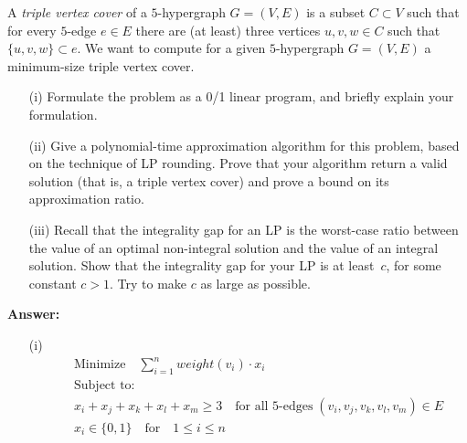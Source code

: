 \documentclass{article}
\renewcommand{\leq}{\leqslant}
\renewcommand{\geq}{\geqslant}
\newcounter{rcounter}
\newenvironment{rlist}%
{\begin{list}{\setnr-\arabic{rcounter}}{\usecounter{rcounter}}}{\end{list}}
\begin{document}
\begin{rlist}
		A \emph{triple vertex cover} of a $5$-hypergraph $G=(V,E)$ is a subset $C\subset V$ such that
		for every $5$-edge $e\in E$ there are (at least) three vertices $u,v,w\in C$ such that $\{u,v,w\}\subset e$.
		We want to compute for a given $5$-hypergraph $G=(V,E)$ a minimum-size
		triple vertex cover.
		\begin{enumerate}
			\item[(i)] Formulate the problem as a 0/1 linear program, and briefly explain
			your formulation.
			\item[(ii)] Give a polynomial-time approximation algorithm for this problem, based on the
			technique of LP rounding. Prove that your algorithm return a valid
			solution (that is, a triple vertex cover) and prove a bound on its approximation ratio.
			\item[(iii)] Recall that the integrality gap for an LP is the 
			worst-case ratio between the value
			of an optimal non-integral solution and the value of an integral solution.
			Show that the integrality gap for your LP is at least~$c$, for some
			constant $c>1$. Try to make $c$ as large as possible.
		\end{enumerate}
		\textbf{Answer:}
        \begin{enumerate}
            \item[(i)] 
            \begin{eqnarray*}
                && \textrm{Minimize} \quad \sum_{i=1}^{n}weight(v_i) \cdot x_i \\
                &&\textrm{Subject to:}\\
                && x_i+x_j+x_k+x_l+x_m \geq 3 \quad \textrm{for all 5-edges} \; (v_i, v_j, v_k, v_l, v_m) \in  E\\
                && x_i \in \{0, 1\} \quad \textrm{for} \quad 1\leq i \leq n
            \end{eqnarray*}
            

\end{enumerate}
\end{rlist}
\end{document}
